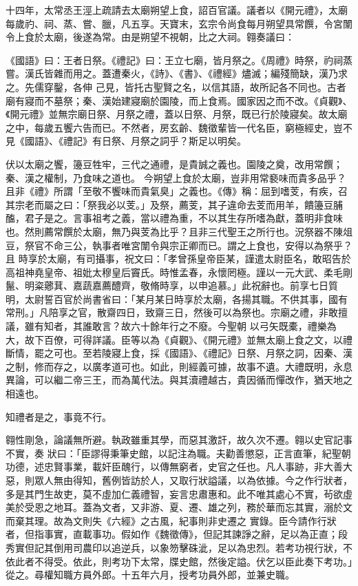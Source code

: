 \begin{pinyinscope}
 十四年，太常丞王涇上疏請去太廟朔望上食，詔百官議。議者以《開元禮》，太廟每歲礿、祠、蒸、嘗、臘，凡五享。天寶末，玄宗令尚食每月朔望具常饌，令宮闈令上食於太廟，後遂為常。由是朔望不視朝，比之大祠。翱奏議曰：



 《國語》曰：王者日祭。《禮記》曰：王立七廟，皆月祭之。《周禮》時祭，礿祠蒸嘗。漢氏皆雜而用之。蓋遭秦火，《詩》、《書》、《禮經》燼滅；編殘簡缺，漢乃求之。先儒穿鑿，各伸
 己見，皆托古聖賢之名，以信其語，故所記各不同也。古者廟有寢而不墓祭；秦、漢始建寢廟於園陵，而上食焉。國家因之而不改。《貞觀》、《開元禮》並無宗廟日祭、月祭之禮，蓋以日祭、月祭，既已行於陵寢矣。故太廟之中，每歲五饗六告而已。不然者，房玄齡、魏徵輩皆一代名臣，窮極經史，豈不見《國語》、《禮記》有日祭、月祭之詞乎？斯足以明矣。



 伏以太廟之饗，籩豆牲牢，三代之通禮，是貴誠之義也。園陵之奠，改用常饌；秦、漢之權制，乃食味之道也。
 今朔望上食於太廟，豈非用常褻味而貴多品乎？且非《禮》所謂「至敬不饗味而貴氣臭」之義也。《傳》稱：屈到嗜芰，有疾，召其宗老而屬之曰：「祭我必以芰。」及祭，薦芰，其子違命去芰而用羊，饋籩豆脯醢，君子是之。言事祖考之義，當以禮為重，不以其生存所嗜為獻，蓋明非食味也。然則薦常饌於太廟，無乃與芰為比乎？且非三代聖王之所行也。況祭器不陳俎豆，祭官不命三公，執事者唯宮闈令與宗正卿而已。謂之上食也，安得以為祭乎？且
 時享於太廟，有司攝事，祝文曰：「孝曾孫皇帝臣某，謹遣太尉臣名，敢昭告於高祖神堯皇帝、祖妣太穆皇后竇氏。時惟孟春，永懷罔極。謹以一元大武、柔毛剛鬣、明粢薌萁、嘉蔬嘉薦醴齊，敬脩時享，以申追慕。」此祝辭也。前享七日質明，太尉誓百官於尚書省曰：「某月某日時享於太廟，各揚其職。不供其事，國有常刑。」凡陪享之官，散齋四日，致齋三日，然後可以為祭也。宗廟之禮，非敢擅議，雖有知者，其誰敢言？故六十餘年行之不廢。今聖朝
 以弓矢既橐，禮樂為大，故下百僚，可得詳議。臣等以為《貞觀》、《開元禮》並無太廟上食之文，以禮斷情，罷之可也。至若陵寢上食，採《國語》、《禮記》日祭、月祭之詞，因秦、漢之制，修而存之，以廣孝道可也。如此，則經義可據，故事不遺。大禮既明，永息異論，可以繼二帝三王，而為萬代法。與其瀆禮越古，貴因循而憚改作，猶天地之相遠也。



 知禮者是之，事竟不行。



 翱性剛急，論議無所避。執政雖重其學，而惡其激訐，故久次不遷。翱以史官記事不實，奏
 狀曰：「臣謬得秉筆史館，以記注為職。夫勸善懲惡，正言直筆，紀聖朝功德，述忠賢事業，載奸臣醜行，以傳無窮者，史官之任也。凡人事跡，非大善大惡，則眾人無由得知，舊例皆訪於人，又取行狀謚議，以為依據。今之作行狀者，多是其門生故吏，莫不虛加仁義禮智，妄言忠肅惠和。此不唯其處心不實，茍欲虛美於受恩之地耳。蓋為文者，又非游、夏、遷、雄之列，務於華而忘其實，溺於文而棄其理。故為文則失《六經》之古風，紀事則非史遷之
 實錄。臣今請作行狀者，但指事實，直載事功。假如作《魏徵傳》，但記其諫諍之辭，足以為正直；段秀實但記其倒用司農印以追逆兵，以象笏擊硃泚，足以為忠烈。若考功視行狀，不依此者不得受。依此，則考功下太常，牒史館，然後定謚。伏乞以臣此奏下考功。」從之。尋權知職方員外郎。十五年六月，授考功員外郎，並兼史職。




\end{pinyinscope}
